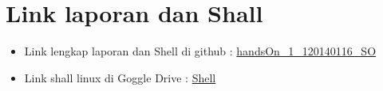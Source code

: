 \documentclass[11pt,a4paper]{article}
\begin{document}
\section{Link laporan dan Shall}
\begin{itemize}
	\item Link lengkap laporan dan Shell di github : \href{https://github.com/masQ-21dev/handsOn_1_120140116_SO.git}{handsOn\_1\_120140116\_SO}
	\item Link shall linux di Goggle Drive : \href{https://drive.google.com/drive/folders/108PHgy26UJxgDnNY7fMCPOvoM_1Gnk_O?usp=sharing}{Shell}
\end{itemize}
\end{document}
